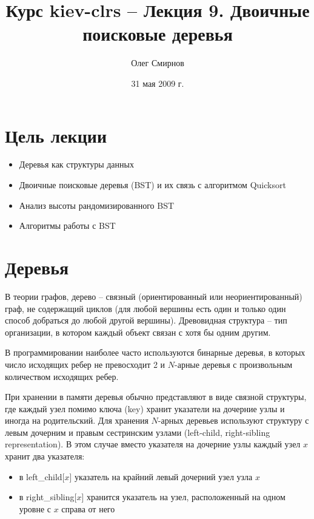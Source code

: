 \documentclass[11pt]{article}
\author{Олег Смирнов}
\title{Курс kiev-clrs -- Лекция 9. Двоичные поисковые деревья}
\date{31 мая 2009 г.}
\begin{document}
\maketitle
\tableofcontents

\newpage
\setlength{\parskip}{1ex plus 0.5ex minus 0.2ex}
\section{Цель лекции}
\begin{itemize}
\item Деревья как структуры данных
\item Двоичные поисковые деревья (BST) и их связь с алгоритмом Quicksort
\item Анализ высоты рандомизированного BST
\item Алгоритмы работы с BST
\end{itemize}

\section{Деревья}

В теории графов, дерево -- связный (ориентированный или неориентированный) граф, не содержащий циклов (для любой вершины есть один и только один способ добраться до любой другой вершины). Древовидная структура -- тип организации, в котором каждый объект связан с хотя бы одним другим.

В программировании наиболее часто используются бинарные деревья, в которых число исходящих ребер не превосходит 2 и $N$-арные деревья с произвольным количеством исходящих ребер.

При хранении в памяти деревья обычно представляют в виде связной структуры, где каждый узел помимо ключа (key) хранит указатели на дочерние узлы и иногда на родительский. Для хранения $N$-арных деревьев используют структуру с левым дочерним и правым сестринским узлами (left-child, right-sibling representation). В этом случае вместо указателя на дочерние узлы каждый узел $x$ хранит два указателя:
\begin{itemize}
\item в left\_child[$x$] указатель на крайний левый дочерний узел узла $x$
\item в right\_sibling[$x$] хранится указатель на узел, расположенный на одном уровне с $x$ справа от него
\end{itemize}
\end{document}
